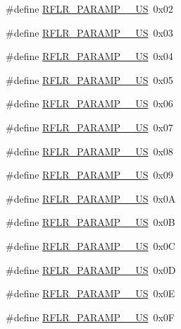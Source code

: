 \begin{DoxyCompactItemize}
\item 
\#define \mbox{\hyperlink{sx1276_regs-_lo_ra_8h_aa50dc8d791c24398ad463dbbe163c218}{R\+F\+L\+R\+\_\+\+P\+A\+R\+A\+M\+P\+\_\+\_\+\+US}}~0x02
\item 
\#define \mbox{\hyperlink{sx1276_regs-_lo_ra_8h_a268b294289d89cac69a2f50608292fb9}{R\+F\+L\+R\+\_\+\+P\+A\+R\+A\+M\+P\+\_\+\_\+\+US}}~0x03
\item 
\#define \mbox{\hyperlink{sx1276_regs-_lo_ra_8h_a31b242b14f8b2b7fb9bf6a0634fe43e2}{R\+F\+L\+R\+\_\+\+P\+A\+R\+A\+M\+P\+\_\+\_\+\+US}}~0x04
\item 
\#define \mbox{\hyperlink{sx1276_regs-_lo_ra_8h_a2ae8ceffd161e8c509cc076715b71c15}{R\+F\+L\+R\+\_\+\+P\+A\+R\+A\+M\+P\+\_\+\_\+\+US}}~0x05
\item 
\#define \mbox{\hyperlink{sx1276_regs-_lo_ra_8h_a23f0326e72ee3f1041d32f7edbe30733}{R\+F\+L\+R\+\_\+\+P\+A\+R\+A\+M\+P\+\_\+\_\+\+US}}~0x06
\item 
\#define \mbox{\hyperlink{sx1276_regs-_lo_ra_8h_a274b21f651fded0ec4d35ed18dc281da}{R\+F\+L\+R\+\_\+\+P\+A\+R\+A\+M\+P\+\_\+\_\+\+US}}~0x07
\item 
\#define \mbox{\hyperlink{sx1276_regs-_lo_ra_8h_a00d7b1b7436424f43314df712aa89fe2}{R\+F\+L\+R\+\_\+\+P\+A\+R\+A\+M\+P\+\_\+\_\+\+US}}~0x08
\item 
\#define \mbox{\hyperlink{sx1276_regs-_lo_ra_8h_a9ce8032bc528b8f1a56e72a0fe6fb956}{R\+F\+L\+R\+\_\+\+P\+A\+R\+A\+M\+P\+\_\+\_\+\+US}}~0x09
\item 
\#define \mbox{\hyperlink{sx1276_regs-_lo_ra_8h_ae596e916faaf110c1306996dbd93d25f}{R\+F\+L\+R\+\_\+\+P\+A\+R\+A\+M\+P\+\_\+\_\+\+US}}~0x0A
\item 
\#define \mbox{\hyperlink{sx1276_regs-_lo_ra_8h_adb4da3360a1b4adf5de2c99f86d502c7}{R\+F\+L\+R\+\_\+\+P\+A\+R\+A\+M\+P\+\_\+\_\+\+US}}~0x0B
\item 
\#define \mbox{\hyperlink{sx1276_regs-_lo_ra_8h_afd5af86b9fcd58b5da08d807ab0deae5}{R\+F\+L\+R\+\_\+\+P\+A\+R\+A\+M\+P\+\_\+\_\+\+US}}~0x0C
\item 
\#define \mbox{\hyperlink{sx1276_regs-_lo_ra_8h_a58992d8a87351616671bb667124c136a}{R\+F\+L\+R\+\_\+\+P\+A\+R\+A\+M\+P\+\_\+\_\+\+US}}~0x0D
\item 
\#define \mbox{\hyperlink{sx1276_regs-_lo_ra_8h_a6af078a4ad16e7e83d180c4470e174e1}{R\+F\+L\+R\+\_\+\+P\+A\+R\+A\+M\+P\+\_\+\_\+\+US}}~0x0E
\item 
\#define \mbox{\hyperlink{sx1276_regs-_lo_ra_8h_a42510cd3823fa579f7ce0a2590414d94}{R\+F\+L\+R\+\_\+\+P\+A\+R\+A\+M\+P\+\_\+\_\+\+US}}~0x0F

\end{DoxyCompactItemize}
